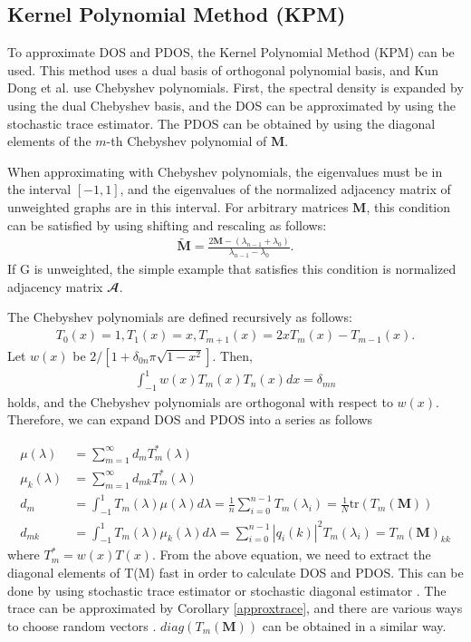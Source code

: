 \documentclass[senior,final,11pt]{iscs-thesis}
\begin{document}
\subsection{Kernel Polynomial Method (KPM)}
To approximate DOS and PDOS, the Kernel Polynomial Method (KPM) \cite{weisse2006kernel} can be used. This method uses a dual basis of orthogonal polynomial basis, and Kun Dong et al.\cite{dong2019network} use Chebyshev polynomials. First, the spectral density is expanded by using the dual Chebyshev basis, and the DOS can be approximated by using the stochastic trace estimator. The PDOS can be obtained by using the diagonal elements of the $m$-th Chebyshev polynomial of ${\mathbf M}$.

When approximating with Chebyshev polynomials, the eigenvalues must be in the interval $[-1,1]$, and the eigenvalues of the normalized adjacency matrix of unweighted graphs are in this interval. For arbitrary matrices ${\mathbf M}$, this condition can be satisfied by using shifting and rescaling as follows:
\begin{align*}
    {\mathbf {\widetilde M}} = \frac{2{\mathbf M} - (\lambda_{n-1} + \lambda_0)}{\lambda_{n-1}-\lambda_0}.
\end{align*}
If G is unweighted, the simple example that satisfies this condition is normalized adjacency matrix ${\mathbfcal A}$.

The Chebyshev polynomials are defined recursively as follows:
\begin{align*}
    T_0(x)=1, T_1(x)=x, T_{m+1}(x) = 2xT_m(x)-T_{m-1}(x).
\end{align*}
Let $w(x)$ be $2/[1+\delta_{0n}\pi \sqrt{1-x^2}]$. Then,
\begin{align*}
    \int_{-1}^{1}w(x)T_m(x)T_n(x)dx = \delta_{mn}
\end{align*}
holds, and the Chebyshev polynomials are orthogonal with respect to $w(x)$. Therefore, we can expand DOS and PDOS into a series as follows

\begin{align}
    \mu(\lambda) &= \sum_{m=1}^{\infty} d_m T^*_m(\lambda) \\
    \mu_k(\lambda) &=  \sum_{m=1}^{\infty} d_{mk} T^*_m(\lambda) \\
    d_m &= \int_{-1}^{1}T_m(\lambda)\mu(\lambda)d\lambda = \frac{1}{n}\sum_{i=0}^{n-1}T_{m}(\lambda_i) = \frac{1}{N}\mathrm{tr}(T_m({\mathbf M})) \\
    d_{mk} &= \int_{-1}^{1}T_m(\lambda)\mu_k(\lambda)d\lambda = \sum_{i=0}^{n-1}|q_i(k)|^2 T_{m}(\lambda_i) = T_m({\mathbf M})_{kk}
\end{align}
where $T^*_m = w(x)T(x)$. From the above equation, we need to extract the diagonal elements of T(M) fast in order to calculate DOS and PDOS. This can be done by using stochastic trace estimator \cite{hutchinson1989stochastic} or stochastic diagonal estimator \cite{bekas2007estimator}. The trace can be approximated by Corollary \ref{approxtrace}, and there are various ways to choose random vectors \cite{avron2011randomized}. $diag(T_m({\mathbf M}))$ can be obtained in a similar way.
\end{document}
